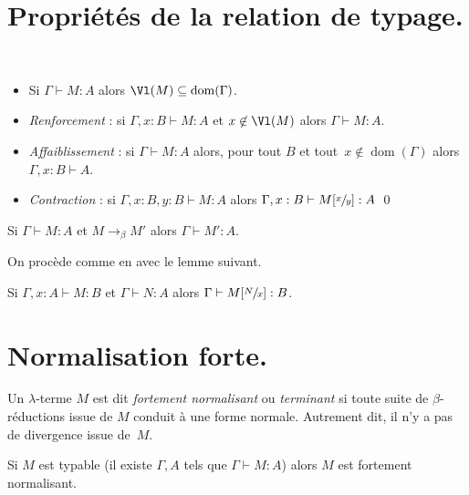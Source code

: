 \documentclass[./main]{subfiles}
\begin{document}
  \section{Propriétés de la relation de typage.}

  \begin{lem}
    ~\\[-1.5\baselineskip]

    \begin{itemize}
      \item Si $\Gamma \vdash M : A$ alors $\Vl(M) \subseteq \operatorname{dom}(\Gamma)$.
      \item \textit{Renforcement} : si $\Gamma , x : B \vdash M : A$ et $x \not\in \Vl(M)$ alors $\Gamma \vdash M : A$.
      \item \textit{Affaiblissement} : si $\Gamma \vdash M : A$ alors, pour tout $B$ et tout~$x \not\in \operatorname{dom}(\Gamma)$ alors~$\Gamma, x : B \vdash A$.
      \item \textit{Contraction} : si $\Gamma, x : B, y : B \vdash M : A$ alors $\Gamma, x : B \vdash M[\sfrac{x}{y}] : A$ \qed
    \end{itemize}
  \end{lem}

  \begin{prop}
    Si $\Gamma \vdash M : A$ et $M \to_\beta M'$ alors $\Gamma \vdash M' : A$.
  \end{prop}
  \begin{prv}
    On procède comme en  avec le lemme suivant.
    \begin{lem}
      Si $\Gamma, x : A \vdash M : B$ et $\Gamma \vdash N : A$ alors $\Gamma \vdash M[\sfrac{N}{x}] : B$.
    \end{lem}
  \end{prv}

  \section{Normalisation forte.}

  \begin{defn}
    Un $\lambda$-terme $M$ est dit \textit{fortement normalisant} ou \textit{terminant} si toute suite de $\beta$-réductions issue de $M$ conduit à une forme normale. Autrement dit, il n'y a pas de divergence issue de~$M$.
  \end{defn}

  \begin{thm}
    Si $M$ est typable (il existe $\Gamma, A$ tels que  $\Gamma \vdash M : A$) alors $M$ est fortement normalisant.
  \end{thm}
\end{document}
